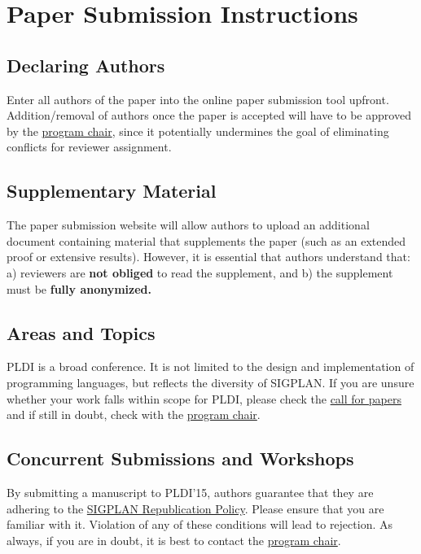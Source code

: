 \section{Paper Submission Instructions}

\subsection{Declaring Authors}

Enter all authors of the paper into the online paper submission tool
upfront. Addition/removal of authors once the paper is accepted will
have to be approved by the \href{mailto:steve.blackburn@anu.edu.au?subject=[PLDI'15]}{program chair}, since it potentially
undermines the goal of eliminating conflicts for reviewer assignment.

\subsection{Supplementary Material}

The paper submission website will allow authors to upload an
additional document containing material that supplements the paper
(such as an extended proof or extensive results).  However, it is
essential that authors understand that: a) reviewers are \textbf{not
  obliged} to read the supplement, and b) the supplement must
  be \textbf{fully anonymized.}

\subsection{Areas and Topics}

PLDI is a broad conference.  It is not limited to the design and
implementation of programming languages, but reflects the diversity of
SIGPLAN.  If you are unsure whether your work falls
within scope for PLDI, please check the
\href{http://conf.researchr.org/track/pldi2015/pldi2015-papers#Call-for-Papers}{call
  for papers} and if still in doubt, check with the
\href{mailto:steve.blackburn@anu.edu.au?subject=[PLDI'15]}{program
  chair}.

\subsection{Concurrent Submissions and Workshops}

By submitting a manuscript to PLDI'15, authors guarantee that they
are adhering to the
\href{http://www.sigplan.org/Resources/Policies/Republication/}{SIGPLAN
  Republication Policy}. Please ensure that you are familiar with it.
Violation of any of these conditions will lead to rejection.
As always, if you are in doubt, it is best to contact the
\href{mailto:steve.blackburn@anu.edu.au?subject=[PLDI'15]}{program
  chair}.

